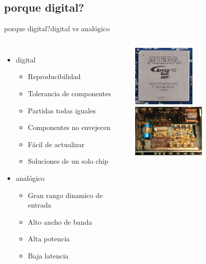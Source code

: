  \subsection{porque digital?}
 \begin{frame}{porque digital?}{digital vs analógico}
    \begin{columns}[onlytextwidth]
       \begin{itemize}
          \item{digital}
             \begin{itemize}
                \item{Reproducibilidad}
                \item{Tolerancia de componentes}
                \item{Partidas todas iguales}
                \item{Componentes no envejecen}
                \item{Fácil de actualizar}
                \item{Soluciones de un solo chip}
             \end{itemize}
          \item{analógico}
             \begin{itemize}
                \item{Gran rango dinamico de entrada}
                \item{Alto ancho de banda}
                \item{Alta potencia}
                \item{Baja latencia}
             \end{itemize}
       \end{itemize}
       \includegraphics[width=30mm]{1_clase/fpga}
       \newline
       \includegraphics[width=35mm]{1_clase/transistor_amp}
    \end{columns}
 \end{frame}
